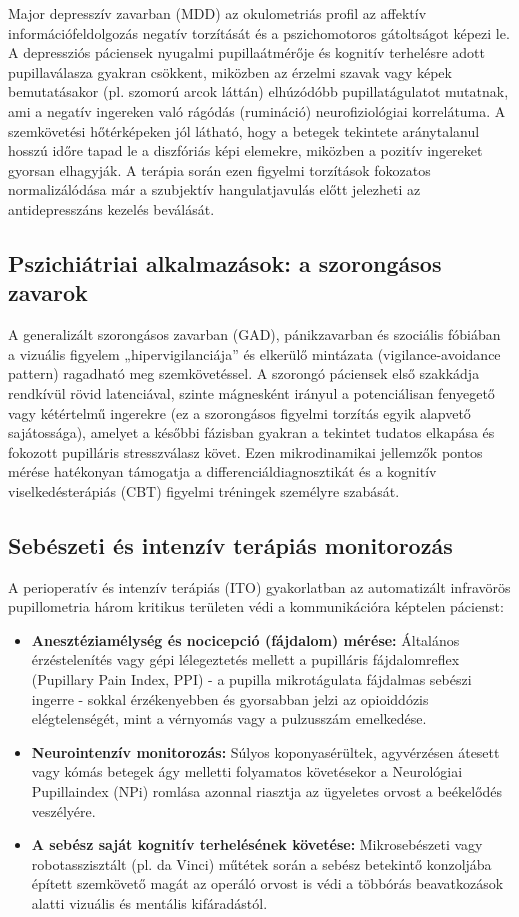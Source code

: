 \documentclass[12pt,a4paper,oneside]{book}
\begin{document}
Major depresszív zavarban (MDD) az okulometriás profil az affektív információfeldolgozás negatív torzítását és a pszichomotoros gátoltságot képezi le. A depressziós páciensek nyugalmi pupillaátmérője és kognitív terhelésre adott pupillaválasza gyakran csökkent, miközben az érzelmi szavak vagy képek bemutatásakor (pl. szomorú arcok láttán) elhúzódóbb pupillatágulatot mutatnak, ami a negatív ingereken való rágódás (rumináció) neurofiziológiai korrelátuma. A szemkövetési hőtérképeken jól látható, hogy a betegek tekintete aránytalanul hosszú időre tapad le a diszfóriás képi elemekre, miközben a pozitív ingereket gyorsan elhagyják. A terápia során ezen figyelmi torzítások fokozatos normalizálódása már a szubjektív hangulatjavulás előtt jelezheti az antidepresszáns kezelés beválását.

\subsection{Pszichiátriai alkalmazások: a szorongásos zavarok}

A generalizált szorongásos zavarban (GAD), pánikzavarban és szociális fóbiában a vizuális figyelem „hipervigilanciája” és elkerülő mintázata (vigilance-avoidance pattern) ragadható meg szemkövetéssel. A szorongó páciensek első szakkádja rendkívül rövid latenciával, szinte mágnesként irányul a potenciálisan fenyegető vagy kétértelmű ingerekre (ez a szorongásos figyelmi torzítás egyik alapvető sajátossága), amelyet a későbbi fázisban gyakran a tekintet tudatos elkapása és fokozott pupilláris stresszválasz követ. Ezen mikrodinamikai jellemzők pontos mérése hatékonyan támogatja a differenciáldiagnosztikát és a kognitív viselkedésterápiás (CBT) figyelmi tréningek személyre szabását.

\subsection{Sebészeti és intenzív terápiás monitorozás}

A perioperatív és intenzív terápiás (ITO) gyakorlatban az automatizált infravörös pupillometria három kritikus területen védi a kommunikációra képtelen pácienst:
\begin{itemize}
    \item \textbf{Anesztéziamélység és nocicepció (fájdalom) mérése:} Általános érzéstelenítés vagy gépi lélegeztetés mellett a pupilláris fájdalomreflex (Pupillary Pain Index, PPI) - a pupilla mikrotágulata fájdalmas sebészi ingerre - sokkal érzékenyebben és gyorsabban jelzi az opioiddózis elégtelenségét, mint a vérnyomás vagy a pulzusszám emelkedése.
    \item \textbf{Neurointenzív monitorozás:} Súlyos koponyasérültek, agyvérzésen átesett vagy kómás betegek ágy melletti folyamatos követésekor a Neurológiai Pupillaindex (NPi) romlása azonnal riasztja az ügyeletes orvost a beékelődés veszélyére.
    \item \textbf{A sebész saját kognitív terhelésének követése:} Mikrosebészeti vagy robotasszisztált (pl. da Vinci) műtétek során a sebész betekintő konzoljába épített szemkövető magát az operáló orvost is védi a többórás beavatkozások alatti vizuális és mentális kifáradástól.
\end{itemize}
\end{document}
